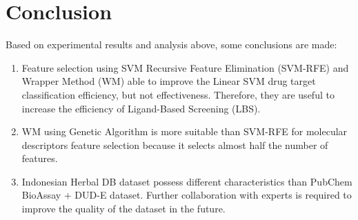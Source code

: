 \documentclass[conference]{IEEEtran}
\begin{document}
\section{Conclusion}

Based on experimental results and analysis above, some conclusions are made:

\begin{enumerate}
	\item Feature selection using SVM Recursive Feature Elimination (SVM-RFE) and Wrapper Method (WM) able to improve the Linear SVM drug target classification efficiency, but not effectiveness. Therefore, they are useful to increase the efficiency of Ligand-Based Screening (LBS).
	\item WM using Genetic Algorithm is more suitable than SVM-RFE for molecular descriptors feature selection because it selects almost half the number of features.
	\item Indonesian Herbal DB dataset possess different characteristics than PubChem BioAssay + DUD-E dataset. Further collaboration with experts is required to improve the quality of the dataset in the future.
\end{enumerate}



\end{document}
